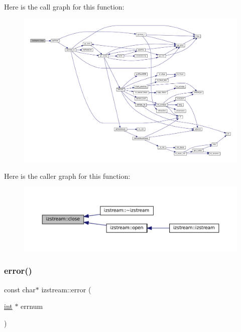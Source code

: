 Here is the call graph for this function\+:
\nopagebreak
\begin{figure}[H]
\begin{center}
\leavevmode
\includegraphics[width=350pt]{classizstream_ac2a7342deb79761277e846c8b24ef92a_cgraph}
\end{center}
\end{figure}
Here is the caller graph for this function\+:
\nopagebreak
\begin{figure}[H]
\begin{center}
\leavevmode
\includegraphics[width=350pt]{classizstream_ac2a7342deb79761277e846c8b24ef92a_icgraph}
\end{center}
\end{figure}
\mbox{\label{classizstream_a19ca9a17f897366d081aae3950f7946e}} 
\subsubsection{\texorpdfstring{error()}{error()}}
{\footnotesize\ttfamily const char$\ast$ izstream\+::error (\begin{DoxyParamCaption}\item[{\mbox{\hyperlink{ioapi_8h_a787fa3cf048117ba7123753c1e74fcd6}{int}} $\ast$}]{errnum }\end{DoxyParamCaption})\hspace{0.3cm}{\ttfamily [inline]}}


